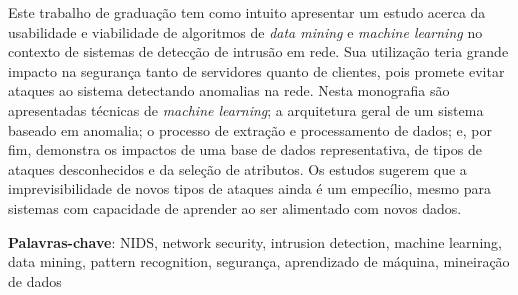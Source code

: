 %
%

Este trabalho de graduação tem como intuito apresentar um estudo acerca da usabilidade e viabilidade de
algoritmos de \textit{data mining} e \textit{machine learning} no contexto de sistemas de detecção de
intrusão em rede. Sua utilização teria grande impacto na segurança tanto de servidores quanto de clientes,
pois promete evitar ataques ao sistema detectando anomalias na rede.
Nesta monografia são apresentadas técnicas de \textit{machine learning}; a arquitetura geral
de um sistema baseado em anomalia; o processo de extração e processamento de dados; e, por fim, demonstra
os impactos de uma base de dados representativa, de tipos de ataques desconhecidos e da seleção de atributos.
Os estudos sugerem que a imprevisibilidade de novos tipos de ataques ainda é um empecílio, mesmo para
sistemas com capacidade de aprender ao ser alimentado com novos dados.

\noindent \textbf{Palavras-chave}: NIDS, network security, intrusion detection, machine learning, data mining,
pattern recognition, segurança, aprendizado de máquina, mineiração de dados
